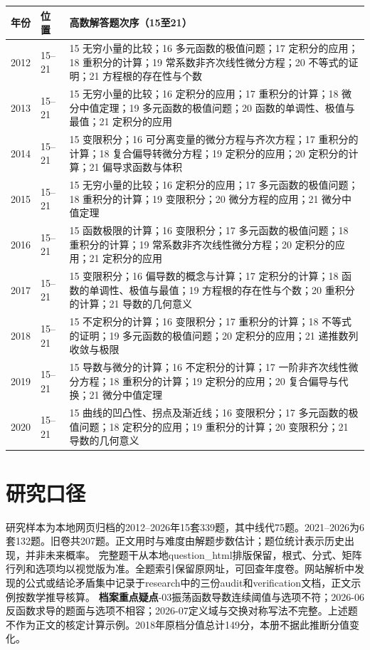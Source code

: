 \small\begin{longtable}{p{12mm}p{15mm}p{116mm}}\toprule 年份&位置&高数解答题次序（15至21）\\\midrule\endhead
2012&15--21&15 无穷小量的比较；16 多元函数的极值问题；17 定积分的应用；18 重积分的计算；19 常系数非齐次线性微分方程；20 不等式的证明；21 方程根的存在性与个数\\
2013&15--21&15 无穷小量的比较；16 定积分的应用；17 重积分的计算；18 微分中值定理；19 多元函数的极值问题；20 函数的单调性、极值与最值；21 定积分的应用\\
2014&15--21&15 变限积分；16 可分离变量的微分方程与齐次方程；17 重积分的计算；18 复合偏导转微分方程；19 定积分的应用；20 定积分的计算；21 偏导求函数与体积\\
2015&15--21&15 无穷小量的比较；16 定积分的应用；17 多元函数的极值问题；18 重积分的计算；19 变限积分；20 微分方程的应用；21 微分中值定理\\
2016&15--21&15 函数极限的计算；16 变限积分；17 多元函数的极值问题；18 重积分的计算；19 常系数非齐次线性微分方程；20 定积分的应用；21 定积分的应用\\
2017&15--21&15 变限积分；16 偏导数的概念与计算；17 定积分的计算；18 函数的单调性、极值与最值；19 方程根的存在性与个数；20 重积分的计算；21 导数的几何意义\\
2018&15--21&15 不定积分的计算；16 变限积分；17 重积分的计算；18 不等式的证明；19 多元函数的极值问题；20 定积分的应用；21 递推数列收敛与极限\\
2019&15--21&15 导数与微分的计算；16 不定积分的计算；17 一阶非齐次线性微分方程；18 重积分的计算；19 定积分的应用；20 复合偏导与代换；21 微分中值定理\\
2020&15--21&15 曲线的凹凸性、拐点及渐近线；16 变限积分；17 多元函数的极值问题；18 定积分的应用；19 重积分的计算；20 变限积分；21 导数的几何意义\\
\bottomrule\end{longtable}\normalsize
\section{研究口径}
研究样本为本地网页归档的2012--2026年15套339题，其中线代75题。2021--2026为6套132题。旧卷共207题。正文用时与难度由解题步数估计；题位统计表示历史出现，并非未来概率。
完整题干从本地question\_html排版保留，根式、分式、矩阵行列和选项均以视觉版为准。全题索引保留原网址，可回查年度卷。网站解析中发现的公式或结论矛盾集中记录于research中的三份audit和verification文档，正文示例按数学推导核算。
\textbf{档案重点疑点}-03振荡函数导数连续阈值与选项不符；2026-06反函数求导的题面与选项不相容；2026-07定义域与交换对称写法不完整。上述题不作为正文的核定计算示例。2018年原档分值总计149分，本册不据此推断分值变化。